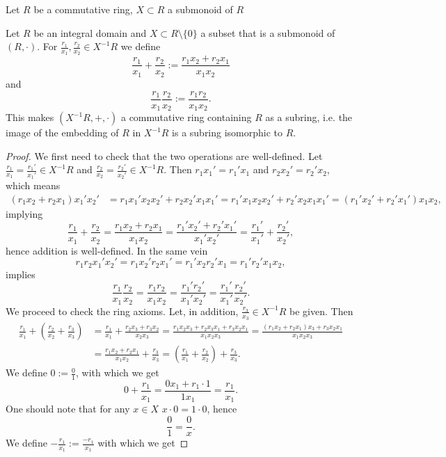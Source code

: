\begin{lemma}
    Let $R$ be a commutative ring, $X\subset R$ a submonoid of $R$
\end{lemma}
\begin{lemma}
    Let $R$ be an integral domain and $X\subset R\setminus \{0\}$ a subset that is a submonoid of $(R,\cdot)$. For $\frac{r_1}{x_1},\frac{r_2}{x_2} \in X^{-1}R$ we define 
    $$\frac{r_1}{x_1}+\frac{r_2}{x_2} := \frac{r_1x_2+r_2x_1}{x_1x_2}$$
    and 
    $$\frac{r_1}{x_1}\frac{r_2}{x_2} := \frac{r_1r_2}{x_1x_2}.$$
    This makes $(X^{-1}R,+,\cdot)$ a commutative ring containing $R$ as a subring, i.e. the image of the embedding of $R$ in $X^{-1}R$ is a subring isomorphic to $R$. 
\end{lemma}
\begin{proof}
    We first need to check that the two operations are well-defined. Let $\frac{r_1}{x_1}=\frac{r_1'}{x_1'}\in X^{-1}R$ and $\frac{r_2}{x_2}=\frac{r_2'}{x_2'}\in X^{-1}R$. Then $r_1x_1' = r_1'x_1$ and $r_2x_2'=r_2'x_2$, which means
    \begin{align*}
        (r_1x_2+r_2x_1)x_1'x_2' &= r_1x_1'x_2x_2'+r_2x_2'x_1x_1' = r_1'x_1x_2x_2'+r_2'x_2x_1x_1'=\left(r_1'x_2'+r_2'x_1'\right)x_1x_2,
    \end{align*}
    implying 
    $$\frac{r_1}{x_1}+\frac{r_2}{x_2} = \frac{r_1x_2+r_2x_1}{x_1x_2} = \frac{r_1'x_2'+r_2'x_1'}{x_1'x_2'} =\frac{r_1'}{x_1'}+\frac{r_2'}{x_2'},$$ hence addition is well-defined. In the same vein 
    $$r_1r_2x_1'x_2' = r_1x_2'r_2x_1' = r_1'x_2r_2'x_1 = r_1'r_2'x_1x_2,$$
    implies 
    $$\frac{r_1}{x_1}\frac{r_2}{x_2} = \frac{r_1r_2}{x_1x_2} = \frac{r_1'r_2'}{x_1'x_2'} = \frac{r_1'}{x_1'}\frac{r_2'}{x_2'}.$$
    We proceed to check the ring axioms. Let, in addition, $\frac{r_3}{x_3}\in X^{-1}R$ be given. Then 
    \begin{align*}
        \frac{r_1}{x_1}+\left(\frac{r_2}{x_2}+\frac{r_3}{x_3}\right) &= \frac{r_1}{x_1} + \frac{r_2x_3+r_3x_2}{x_2x_3} = \frac{r_1x_2x_3+r_2x_3x_1+r_3x_2x_1}{x_1x_2x_3} = \frac{(r_1x_2+r_2x_1)x_3+r_3x_2x_1}{x_1x_2x_3} \\
        &= \frac{r_1x_2+r_2x_1}{x_1x_2}+\frac{r_3}{x_3} = \left(\frac{r_1}{x_1}+\frac{r_2}{x_2}\right) + \frac{r_3}{x_3}.
    \end{align*}
    We define $0 := \frac{0}{1}$, with which we get 
    $$0+\frac{r_1}{x_1} = \frac{0x_1+r_1\cdot 1}{1x_1} = \frac{r_1}{x_1}.$$
    One should note that for any $x\in X$ $x\cdot 0 = 1\cdot 0$, hence
    $$\frac{0}{1} = \frac{0}{x}.$$
    We define $-\frac{r_1}{x_1}:= \frac{-r_1}{x_1}$ with which we get 

\end{proof}
